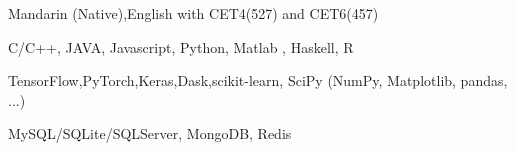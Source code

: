 
\begin{cvtbl}
        {Mandarin (Native),English with CET4(527) and CET6(457)}%

        {C/C++, JAVA, Javascript, Python, Matlab , Haskell, R}

        {TensorFlow,PyTorch,Keras,Dask,scikit-learn, SciPy (NumPy, Matplotlib, pandas, ...)}

        {MySQL/SQLite/SQLServer, MongoDB, Redis}

\end{cvtbl}

\endinput